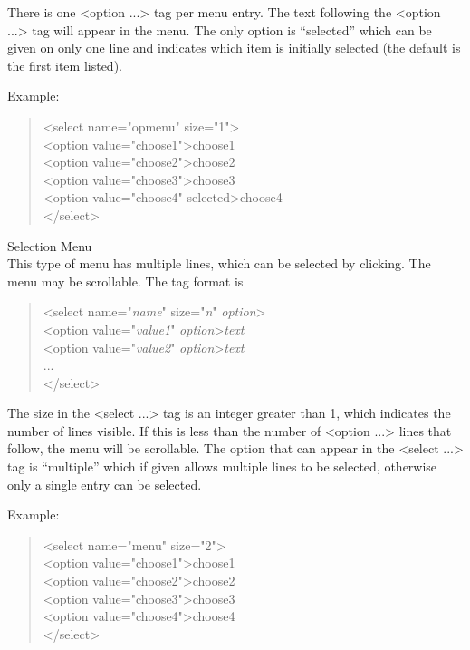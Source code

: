 \begin{description}
There is one {\vt <option ...>} tag per menu entry.  The text
following the {\vt <option ...>} tag will appear in the menu.  The
only option is ``{\vt selected}'' which can be given on only one line
and indicates which item is initially selected (the default is the
first item listed).

Example:
\begin{quote}
{\vt <select name="opmenu" size="1">}\\
{\vt <option value="choose1">choose1}\\
{\vt <option value="choose2">choose2}\\
{\vt <option value="choose3">choose3}\\
{\vt <option value="choose4" selected>choose4}\\
{\vt </select>}
\end{quote}

\item{Selection Menu}\\
This type of menu has multiple lines, which can be selected by
clicking.  The menu may be scrollable.  The tag format is
\begin{quote}
{\vt <select name="{\it name\/}" size="{\it n\/}" {\it option\/}>}\\
{\vt <option value="{\it value1\/}" {\it option\/}>{\it text}}\\
{\vt <option value="{\it value2\/}" {\it option\/}>{\it text}}\\
...\\
{\vt </select>}
\end{quote}

The size in the {\vt <select ...>} tag is an integer greater than
1, which indicates the number of lines visible.  If this is less than
the number of {\vt <option ...>} lines that follow, the menu will
be scrollable.  The option that can appear in the {\vt <select
...>} tag is ``{\vt multiple}'' which if given allows multiple lines
to be selected, otherwise only a single entry can be selected.

Example:
\begin{quote}
{\vt <select name="menu" size="2">}\\
{\vt <option value="choose1">choose1}\\
{\vt <option value="choose2">choose2}\\
{\vt <option value="choose3">choose3}\\
{\vt <option value="choose4">choose4}\\
{\vt </select>}
\end{quote}


\end{description}
